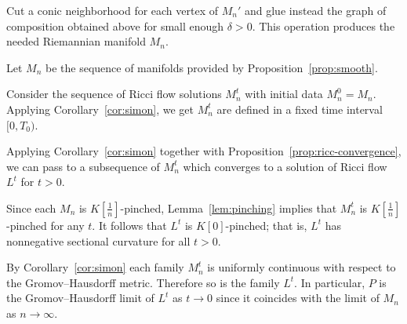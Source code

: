 \documentclass[a4paper,10pt]{amsart}
\begin{document}
Cut a conic neighborhood for each vertex of $M_n'$
and glue instead the graph of composition obtained above 
for small enough $\delta>0$. 
This operation produces the needed Riemannian manifold $M_n$.
\qeds

Let $M_n$ be the sequence of manifolds provided by Proposition~\ref{prop:smooth}.

Consider the sequence of Ricci flow solutions $M_n^t$ 
with initial data $M^0_n=M_n$.
Applying Corollary~\ref{cor:simon}, 
we get $M_n^t$ are defined in a fixed time interval $[0,T_0)$.

Applying Corollary~\ref{cor:simon} together with Proposition~\ref{prop:ricc-convergence}, 
we can pass to a subsequence of $M_n^t$ which converges to a solution of Ricci flow $L^t$ for  $t>0$.

Since each $M_n$ is $K[\tfrac1n]$-pinched,
Lemma~\ref{lem:pinching} implies that $M_n^t$ is $K[\tfrac1n]$-pinched for any $t$.
It follows that $L^t$ is $K[0]$-pinched;
that is, $L^t$ has nonnegative sectional curvature for all $t>0$.

By Corollary~\ref{cor:simon} each family $M_n^t$ is uniformly continuous with respect to the Gromov--Hausdorff metric.
Therefore so is the family $L^t$.
In particular, $P$ is the Gromov--Hausdorff limit of $L^t$ as $t\to 0$
since it coincides with the limit of $M_n$ as $n\to \infty$.
\qeds
\end{document}
